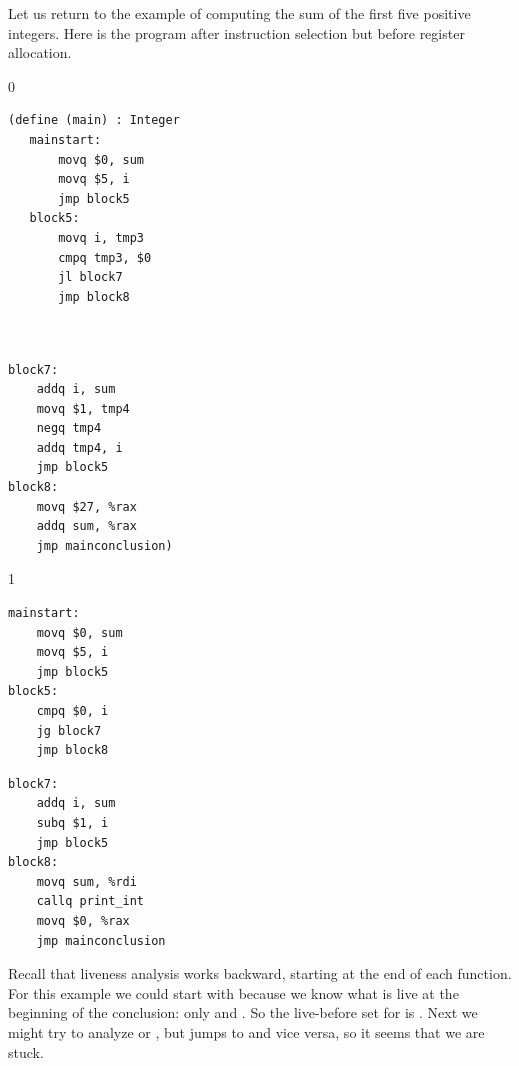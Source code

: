 \documentclass[7x10]{TimesAPriori_MIT}%
\def\racketEd{0}
\def\pythonEd{1}
\def\edition{1}
\newcommand{\pythonColor}[0]{}
\numberwithin{theorem}{chapter}
\numberwithin{definition}{chapter}
\numberwithin{equation}{chapter}
\begin{document}
Let us return to the example of computing the sum of the first five
positive integers. Here is the program after instruction
selection but before register
allocation.
\begin{center}
{\if\edition\racketEd    
  \begin{minipage}{0.45\textwidth}
\begin{lstlisting}
(define (main) : Integer
   mainstart:
       movq $0, sum
       movq $5, i
       jmp block5
   block5:
       movq i, tmp3
       cmpq tmp3, $0
       jl block7
       jmp block8
\end{lstlisting}
\end{minipage}
\begin{minipage}{0.45\textwidth}
  \begin{lstlisting}

    
block7:
    addq i, sum
    movq $1, tmp4
    negq tmp4
    addq tmp4, i
    jmp block5
block8:
    movq $27, %rax
    addq sum, %rax
    jmp mainconclusion)
\end{lstlisting}
  \end{minipage}
\fi}
{\if\edition\pythonEd\pythonColor
\begin{minipage}{0.45\textwidth}
\begin{lstlisting}
mainstart:
    movq $0, sum
    movq $5, i
    jmp block5
block5:
    cmpq $0, i
    jg block7
    jmp block8
\end{lstlisting}
\end{minipage}
\begin{minipage}{0.45\textwidth}
\begin{lstlisting}
block7:
    addq i, sum
    subq $1, i
    jmp block5
block8:
    movq sum, %rdi
    callq print_int
    movq $0, %rax
    jmp mainconclusion
\end{lstlisting}
  \end{minipage}
\fi}
\end{center}
Recall that liveness analysis works backward, starting at the end
of each function. For this example we could start with 
because we know what is live at the beginning of the conclusion:
only  and . So the live-before set
for  is .
%
Next we might try to analyze  or , but
 jumps to  and vice versa, so it seems that
we are stuck.
\end{document}
